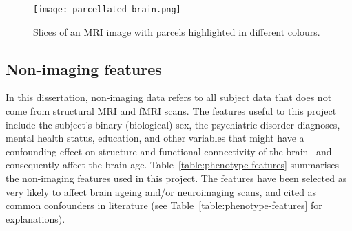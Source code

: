 \begin{figure}[h!]
    \centering
    \texttt{[image: parcellated\_brain.png]}
    \caption{Slices of an MRI image with parcels highlighted in different colours.}\label{figure:parcellated-brain}
\end{figure}


\subsection{Non-imaging features}

In this dissertation, non-imaging data refers to all subject data that does not come from structural MRI and fMRI scans. The features useful to this project include the subject's binary (biological) sex, the psychiatric disorder diagnoses, mental health status, education, and other variables that might have a confounding effect on structure and functional connectivity of the brain~\cite{ruigrok2014meta} and consequently affect the brain age. Table~\ref{table:phenotype-features} summarises the non-imaging features used in this project. The features have been selected as very likely to affect brain ageing and/or neuroimaging scans, and cited as common confounders in literature (see Table~\ref{table:phenotype-features} for explanations).

